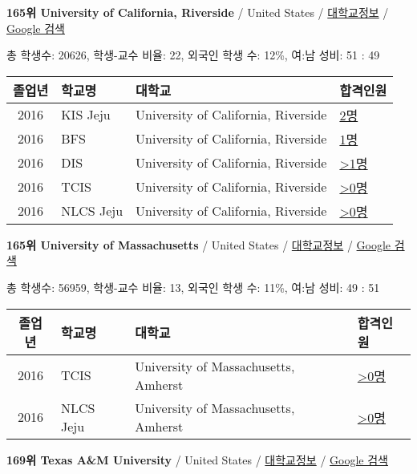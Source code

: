 \documentclass[13pt,]{article}
\begin{document}
\textbf{165위 University of California, Riverside} / United States /
\href{https://www.timeshighereducation.com/world-university-rankings/university-of-california-riverside?ranking-dataset=589595}{대학교정보}
/
\href{http://www.google.com/search?q=University+of+California,+Riverside}{Google
검색}

총 학생수: 20626, 학생-교수 비율: 22, 외국인 학생 수: 12\%, 여:남 성비:
51 : 49

\begin{longtable}[]{@{}clll@{}}
\toprule
졸업년 & 학교명 & 대학교 & 합격인원\tabularnewline
\midrule
\endhead
2016 & KIS Jeju & University of California, Riverside &
\href{http://cafe.naver.com/assarabia/11596}{2명}\tabularnewline
2016 & BFS & University of California, Riverside &
\href{http://cafe.naver.com/assarabia/11597}{1명}\tabularnewline
2016 & DIS & University of California, Riverside &
\href{http://cafe.naver.com/assarabia/11591}{\textgreater{}1명}\tabularnewline
2016 & TCIS & University of California, Riverside &
\href{http://cafe.naver.com/assarabia/11598}{\textgreater{}0명}\tabularnewline
2016 & NLCS Jeju & University of California, Riverside &
\href{http://cafe.naver.com/assarabia/11592}{\textgreater{}0명}\tabularnewline
\bottomrule
\end{longtable}

\textbf{165위 University of Massachusetts} / United States /
\href{https://www.timeshighereducation.com/world-university-rankings/university-of-massachusetts?ranking-dataset=589595}{대학교정보}
/
\href{http://www.google.com/search?q=University+of+Massachusetts}{Google
검색}

총 학생수: 56959, 학생-교수 비율: 13, 외국인 학생 수: 11\%, 여:남 성비:
49 : 51

\begin{longtable}[]{@{}clll@{}}
\toprule
졸업년 & 학교명 & 대학교 & 합격인원\tabularnewline
\midrule
\endhead
2016 & TCIS & University of Massachusetts, Amherst &
\href{http://cafe.naver.com/assarabia/11598}{\textgreater{}0명}\tabularnewline
2016 & NLCS Jeju & University of Massachusetts, Amherst &
\href{http://cafe.naver.com/assarabia/11592}{\textgreater{}0명}\tabularnewline
\bottomrule
\end{longtable}

\textbf{169위 Texas A\&M University} / United States /
\href{https://www.timeshighereducation.com/world-university-rankings/texas-aampm-university?ranking-dataset=589595}{대학교정보}
/ \href{http://www.google.com/search?q=Texas+A\&M+University}{Google
검색}
\end{document}
